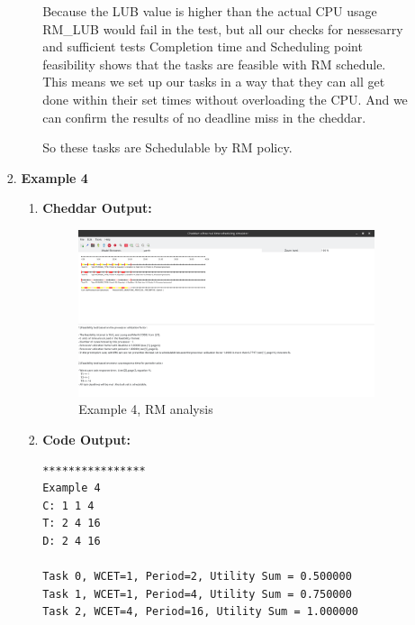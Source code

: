 \documentclass[a4paper,11pt]{article}%
\newenvironment{qanda}{\setlength{\parindent}{0pt}}{\bigskip}
\begin{document}
\begin{qanda}
\begin{enumerate}
\begin{enumerate}
\begin{enumerate}
\begin{enumerate}
						                  Because the LUB value is higher than the actual CPU usage RM\_LUB would fail in the test, but all our checks for nessesarry and sufficient tests Completion time and Scheduling point feasibility shows that the tasks are feasible with RM schedule. This means we set up our tasks in a way that they can all get done within their set times without overloading the CPU. And we can confirm the results of no deadline miss in the cheddar.

						                  So these tasks are Schedulable by RM policy.

					            \end{enumerate}
					      \item \textbf{Example 4}
					            \begin{enumerate}
						            \item \textbf{Cheddar Output:}\\
						                  \begin{figure}[H]
							                  \centering
							                  \includegraphics[scale=0.36]{figures/ex4_rm.png}
							                  \caption{Example 4, RM analysis}
						                  \end{figure}
						            \item \textbf{Code Output:}\\
						                  \begin{verbatim}
****************
Example 4
C: 1 1 4
T: 2 4 16
D: 2 4 16

Task 0, WCET=1, Period=2, Utility Sum = 0.500000
Task 1, WCET=1, Period=4, Utility Sum = 0.750000
Task 2, WCET=4, Period=16, Utility Sum = 1.000000


\end{verbatim}
\end{enumerate}
\end{enumerate}
\end{enumerate}
\end{enumerate}
\end{qanda}
\end{document}

